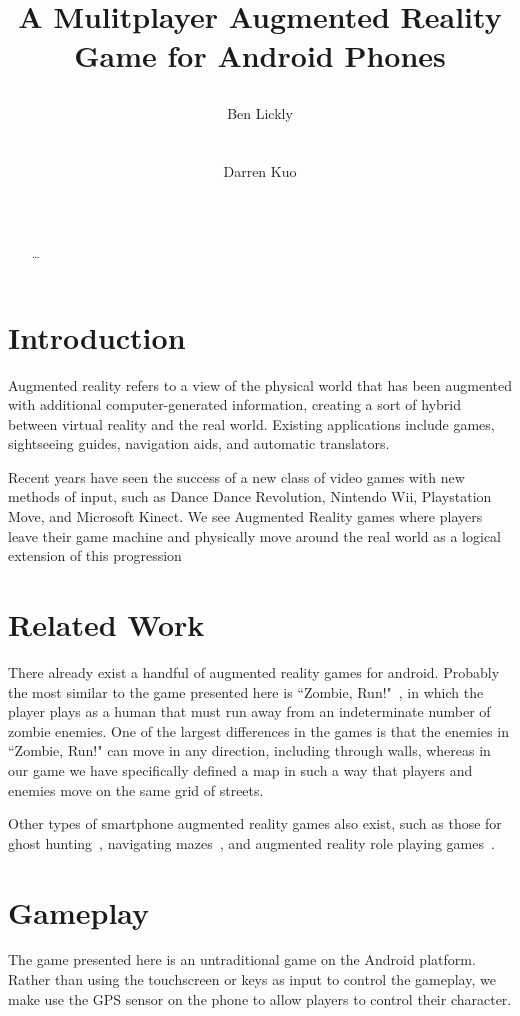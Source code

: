 \documentclass{acm_proc_article-sp}
\title{A Mulitplayer Augmented Reality Game for Android Phones
\numberofauthors{2}
\author{
\alignauthor Ben Lickly \\
       \affaddr{University of California, Berkeley}\\
       \affaddr{Berkeley, CA, USA} \\
       \email{blickly@eecs.berkeley.edu}
\alignauthor Darren Kuo \\
       \affaddr{University of California, Berkeley}\\
       \affaddr{Berkeley, CA, USA} \\
       \email{darrenkuo@eecs.berkeley.edu}
}
}
\begin{document}
\maketitle

\begin{abstract}
\ldots
\cite{ZombieRun}
\end{abstract}

\section{Introduction}
Augmented reality refers to a view of the physical world that has been
augmented with additional computer-generated information, creating a
sort of hybrid between virtual reality and the real world. Existing
applications include games, sightseeing guides, navigation aids, and
automatic translators.

Recent years have seen the success of a new class of video games with
new methods of input, such as Dance Dance Revolution, Nintendo Wii,
Playstation Move, and Microsoft Kinect. We see Augmented Reality games
where players leave their game machine and physically move around the
real world as a logical extension of this progression

\section{Related Work}
There already exist a handful of augmented reality games for android. Probably
the most similar to the game presented here is ``Zombie, Run!"~\cite{ZombieRun},
in which the player plays as a human that must run away from an indeterminate number of zombie enemies. One of the largest differences in the games is
that the enemies in ``Zombie, Run!" can move in any direction, including
through walls, whereas in our game we have specifically defined a map in
such a way that players and enemies move on the same grid of streets.

Other types of smartphone augmented reality games also exist, such
as those for ghost hunting~\cite{SpecTrek}, navigating mazes~\cite{ARLabyrinth},
and augmented reality role playing games~\cite{ParallelKingdom}.


\section{Gameplay}
The game presented here is an untraditional game on the Android platform.
Rather than using the touchscreen or keys as input to control the gameplay,
we make use the GPS sensor on the phone to allow players to control their character.
\end{document}
